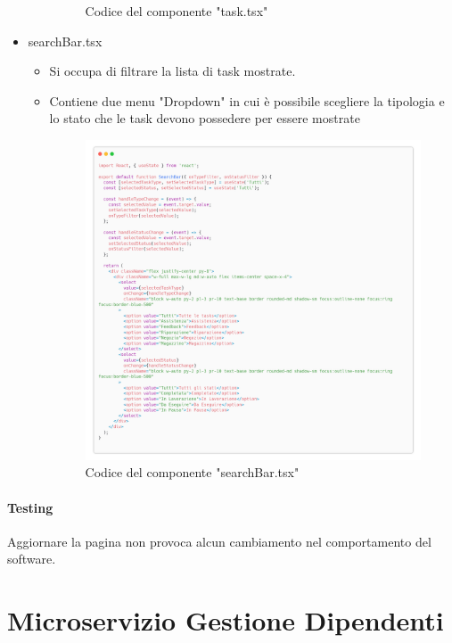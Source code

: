\documentclass{report}
\begin{document}
\begin{itemize}
\begin{itemize}
\begin{figure}[H]
			Codice del componente "task.tsx"
		\end{figure}
	\end{itemize}
	\item searchBar.tsx
	\begin{itemize}
		\item Si occupa di filtrare la lista di task mostrate.
		\item Contiene due menu "Dropdown" in cui è possibile scegliere la tipologia e lo stato che le task devono possedere per essere mostrate
		\begin{figure}[H]
			\centering\includegraphics[width=1\textwidth]{images/microservizio-task/frontend/searchBar-carbon.png}
			Codice del componente "searchBar.tsx"
		\end{figure}
	\end{itemize}
\end{itemize}

\subsubsection*{Testing}
Aggiornare la pagina non provoca alcun cambiamento nel comportamento del software.




\chapter{Microservizio Gestione Dipendenti}
\end{document}
